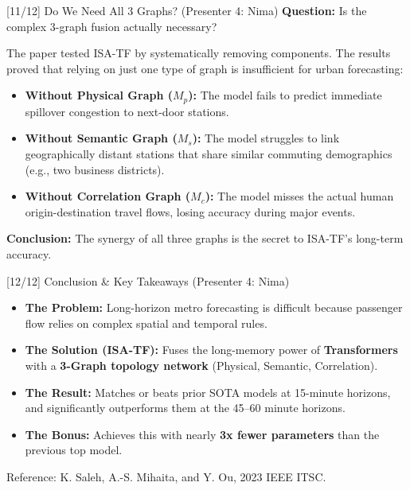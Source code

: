 \documentclass[aspectratio=169]{beamer}
\begin{document}
\begin{frame}{[11/12] Do We Need All 3 Graphs? (Presenter 4: Nima)}
  \hypertarget{sec:discussion}{}
  \textbf{Question:} Is the complex 3-graph fusion actually necessary?
  
  \vspace{0.2cm}
  The paper tested ISA-TF by systematically removing components. The results proved that relying on just one type of graph is insufficient for urban forecasting:
  
  \begin{itemize}
    \item \textbf{Without Physical Graph ($M_p$):} The model fails to predict immediate spillover congestion to next-door stations.
    \item \textbf{Without Semantic Graph ($M_s$):} The model struggles to link geographically distant stations that share similar commuting demographics (e.g., two business districts).
    \item \textbf{Without Correlation Graph ($M_c$):} The model misses the actual human origin-destination travel flows, losing accuracy during major events.
  \end{itemize}
  
  \vspace{0.2cm}
  \textbf{\color{plumNight}Conclusion:} The synergy of all three graphs is the secret to ISA-TF's long-term accuracy.
\end{frame}

\begin{frame}{[12/12] Conclusion \& Key Takeaways (Presenter 4: Nima)}
  \begin{itemize}
    \item \textbf{The Problem:} Long-horizon metro forecasting is difficult because passenger flow relies on complex spatial and temporal rules.
    \item \textbf{The Solution (ISA-TF):} Fuses the long-memory power of \textbf{Transformers} with a \textbf{3-Graph topology network} (Physical, Semantic, Correlation).
    \item \textbf{The Result:} Matches or beats prior SOTA models at 15-minute horizons, and significantly outperforms them at the 45--60 minute horizons.
    \item \textbf{The Bonus:} Achieves this with nearly \textbf{3x fewer parameters} than the previous top model.
  \end{itemize}
  
  \vspace{0.6em}
  \small Reference: K. Saleh, A.-S. Mihaita, and Y. Ou, 2023 IEEE ITSC.
\end{frame}
\end{document}
